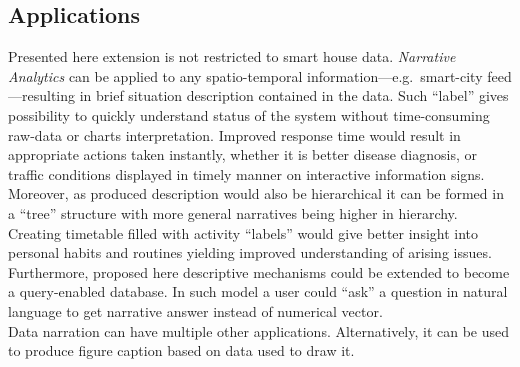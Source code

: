 \documentclass[12pt, a4paper, pdflatex, leqno, twoside]{report}
\begin{document}
  \subsection{Applications}
Presented here extension is not restricted to smart house data. \emph{Narrative Analytics} can be applied to any spatio-temporal information---e.g.\ smart-city feed---resulting in brief situation description contained in the data. Such ``label'' gives possibility to quickly understand status of the system without time-consuming raw-data or charts interpretation. Improved response time would result in appropriate actions taken instantly, whether it is better disease diagnosis, or traffic conditions displayed in timely manner on interactive information signs.\\
Moreover, as produced description would also be hierarchical it can be formed in a ``tree'' structure with more general narratives being higher in hierarchy. Creating timetable filled with activity ``labels'' would give better insight into personal habits and routines yielding improved understanding of arising issues.\\
Furthermore, proposed here descriptive mechanisms could be extended to become a query-enabled database. In such model a user could ``ask'' a question in natural language to get narrative answer instead of numerical vector.\\

Data narration can have multiple other applications. Alternatively, it can be used to produce figure caption based on data used to draw it.





\end{document}

